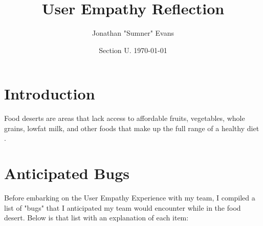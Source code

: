 \documentclass[11pt]{article}
\title{User Empathy Reflection}
\author{Jonathan "Sumner" Evans}
\date{Section U. \today}
\begin{document}
\maketitle

\section{Introduction} %
Food deserts are areas that lack access to affordable fruits, vegetables, whole grains, lowfat milk,
and other foods that make up the full range of a healthy diet \cite{cdc}. 

\section{Anticipated Bugs}
Before embarking on the User Empathy Experience with my team, I compiled a list of "bugs" that I
anticipated my team would encounter while in the food desert. Below is that list with an explanation
of each item:
\end{document}
